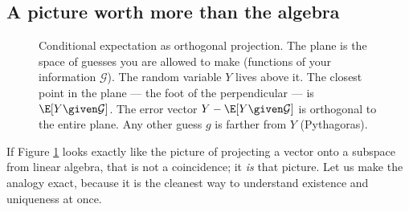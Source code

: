 \subsection{A picture worth more than the algebra}
\label{ch38:projection-picture}

\begin{figure}[H]
\centering
{}
\caption{Conditional expectation as orthogonal projection. The plane is the space of guesses you are
allowed to make (functions of your information $\mathcal{G}$). The random variable $Y$ lives above it.
The closest point in the plane --- the foot of the perpendicular --- is $\E[Y \given \mathcal{G}]$.
The error vector $Y - \E[Y \given \mathcal{G}]$ is orthogonal to the entire plane. Any other guess
$g$ is farther from $Y$ (Pythagoras).}
\label{ch38:fig-projection}
\end{figure}

If Figure \ref{ch38:fig-projection} looks exactly like the picture of projecting a vector onto a
subspace from linear algebra, that is not a coincidence; it \emph{is} that picture. Let us make the
analogy exact, because it is the cleanest way to understand existence and uniqueness at once.

